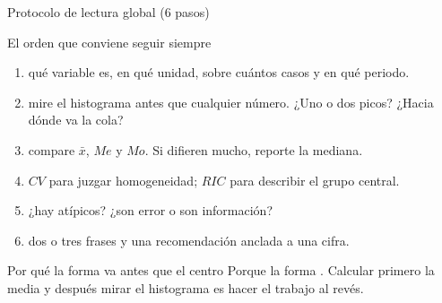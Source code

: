 \documentclass[aspectratio=169,10pt]{beamer}
\begin{document}
\begin{frame}{Protocolo de lectura global (6 pasos)}
  \footnotesize
  \begin{block}{El orden que conviene seguir siempre}
    \scriptsize
    \begin{enumerate}\setlength{\itemsep}{-0.03cm}
      \item {} qué variable es, en qué unidad, sobre cuántos
            casos y en qué periodo.
      \item {} mire el histograma antes que cualquier número.
            ¿Uno o dos picos? ¿Hacia dónde va la cola?
      \item {} compare $\bar{x}$, $Me$ y $Mo$. Si difieren mucho,
            reporte la mediana.
      \item {} $CV$ para juzgar homogeneidad; $RIC$ para
            describir el grupo central.
      \item {} ¿hay atípicos? ¿son error o son
            información?
      \item {} dos o tres frases y una recomendación anclada a
            una cifra.
    \end{enumerate}
  \end{block}

  \vspace{0.08cm}
  \begin{alertblock}{Por qué la forma va antes que el centro}
    \tiny
    Porque la forma . Calcular
    primero la media y después mirar el histograma es hacer el trabajo al
    revés.
  \end{alertblock}
\end{frame}
\end{document}
